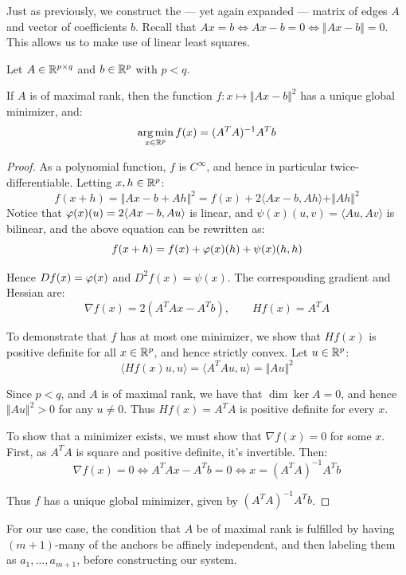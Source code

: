 Just as previously, we construct the --- yet again expanded --- matrix of edges $A$ and vector of coefficients $b$. Recall that $Ax=b\iff Ax-b=0 \iff \Vert Ax-b\Vert=0$. This allows us to make use of linear least squares.

\begin{Theorem}
Let $A\in \mathbb R^{p\times q}$ and $b\in\mathbb R^p$ with $p<q$.

If $A$ is of maximal rank, then the function $f:x\mapsto \Vert Ax-b\Vert^2$ has a unique global minimizer, and:
\[
    \operatorname*{arg\,min}_{x\in\mathbb R^p} f(x) = (A^TA)^{-1}A^Tb
\]
\end{Theorem}

\begin{proof}
As a polynomial function, $f$ is $C^\infty$, and hence in particular twice-differentiable. Letting $x,h\in\mathbb R^p$:
\[
    f(x+h) = \Vert Ax-b + Ah\Vert^2 = f(x) + 2\langle Ax-b,Ah \rangle + \Vert Ah\Vert^2
\]
Notice that $\varphi(x)(u) = 2\langle Ax-b, Au\rangle$ is linear, and $\psi(x)(u,v) = \langle Au,Av\rangle$ is bilinear, and the above equation can be rewritten as:
\[
    f(x+h) = f(x) + \varphi(x)(h) + \psi(x)(h,h)
\]

Hence $Df(x) = \varphi(x)$ and $D^2f(x) = \psi(x)$. The corresponding gradient and Hessian are:
\[
    \nabla f(x) = 2(A^TAx - A^Tb), \qquad Hf(x) = A^TA
\]

To demonstrate that $f$ has at most one minimizer, we show that $Hf(x)$ is positive definite for all $x\in\mathbb R^p$, and hence strictly convex. Let $u\in\mathbb R^p$:
\[
    \langle Hf(x)u, u\rangle = \langle A^TAu, u\rangle = \Vert Au\Vert^2
\]

Since $p<q$, and $A$ is of maximal rank, we have that $\dim\ker A = 0$, and hence $\Vert Au\Vert^2 > 0$ for any $u\neq 0$. Thus $Hf(x)=A^TA$ is positive definite for every $x$.

To show that a minimizer exists, we must show that $\nabla f(x) = 0$ for some $x$. First, as $A^TA$ is square and positive definite, it's invertible. Then:
\[
    \nabla f(x) = 0
    \iff A^TAx - A^Tb = 0
    \iff x = (A^TA)^{-1}A^Tb
\]

Thus $f$ has a unique global minimizer, given by $(A^TA)^{-1}A^Tb$.
\end{proof}

For our use case, the condition that $A$ be of maximal rank is fulfilled by having $(m+1)$-many of the anchors be affinely independent, and then labeling them as $a_1,\dots,a_{m+1}$, before constructing our system.


